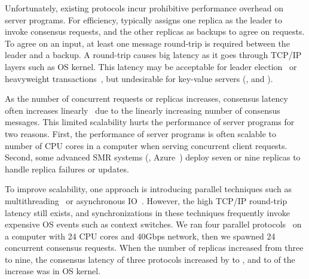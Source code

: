 Unfortunately, existing \paxos protocols incur prohibitive performance overhead 
on server programs. For efficiency, \paxos typically assigns one replica as the 
leader to invoke consensus requests, and the other replicas as backups to agree 
on requests. To agree on an input, at least one message round-trip is required 
between the leader and a backup. A round-trip causes big latency as it goes 
through TCP/IP layers such as OS kernel. This latency may be acceptable for 
leader election~\cite{chubby:osdi,zookeeper} or heavyweight 
transactions~\cite{crane:sosp15,eve:osdi12}, but undesirable for
key-value servers (\eg, \redis and \memcached).


As the number of concurrent requests or replicas increases, \paxos consensus 
latency often increases linearly~\cite{scatter:sosp11} due to the linearly 
increasing number of consensus messages. This limited scalability hurts the 
performance of server programs for two reasons. First, the performance of 
server programs is often scalable to number of CPU cores in a computer when 
serving concurrent client requests. Second, some advanced SMR systems (\eg, 
Azure~\cite{azure:book}) deploy seven or nine replicas to handle replica 
failures or updates.

To improve \paxos scalability, one approach is introducing parallel techniques 
such as multithreading~\cite{zookeeper, spaxos:srds12} or asynchronous 
IO~\cite{crane:sosp15, libpaxos}. However, the high TCP/IP round-trip latency 
still exists, and synchronizations in these techniques frequently invoke 
expensive OS events such as context switches. We ran four parallel \paxos 
protocols~\cite{zookeeper, spaxos:srds12, crane:sosp15, libpaxos} on a computer 
with 24 CPU cores and 40Gbps network, then we spawned 24 concurrent consensus 
requests. When the number of replicas increased from three to nine, the 
consensus latency of three protocols increased by \tradlatencyincreaselow to 
\tradlatencyincreasehigh, and \systemcostlow to \systemcosthigh of the increase 
was in OS kernel.


